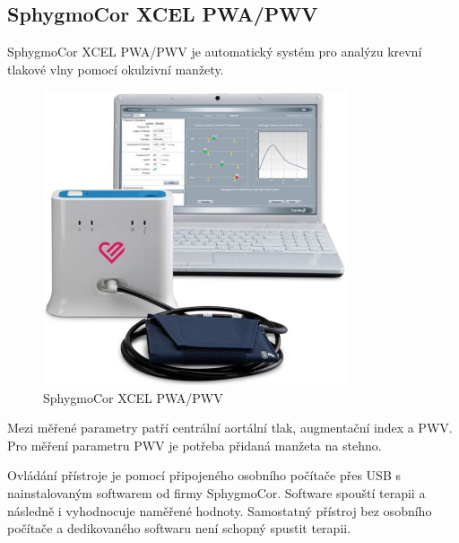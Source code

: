 \subsection{SphygmoCor XCEL PWA/PWV}
SphygmoCor XCEL PWA/PWV je automatický systém pro analýzu krevní tlakové vlny pomocí okulzivní manžety.
\cite{cite:SphygmoCor}
\begin{figure}[H]
    \caption{SphygmoCor XCEL PWA/PWV \cite{cite:SphygmoCor}}
    \includegraphics[width=0.8\textwidth]{pictures/XCEL_System.jpg}
\end{figure}
Mezi měřené parametry patří centrální aortální tlak, augmentační index a PWV. Pro měření parametru PWV je potřeba přidaná manžeta na stehno.
\cite{cite:SphygmoCor}
\par
Ovládání přístroje je pomocí připojeného osobního počítače přes USB s nainstalovaným softwarem od firmy SphygmoCor. Software spouští terapii a následně i vyhodnocuje naměřené hodnoty. Samostatný přístroj bez osobního počítače a dedikovaného softwaru není schopný spustit terapii.
\cite{cite:SphygmoCor}
